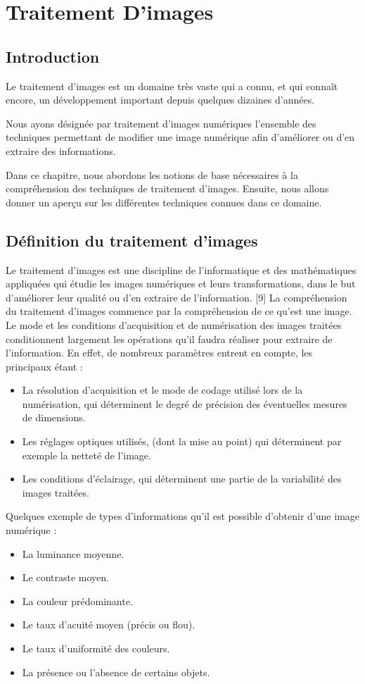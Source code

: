\documentclass[11pt]{report}
\begin{document}
\chapter{Traitement D'images}
\section{Introduction}
Le traitement d’images est un domaine très vaste qui a connu, et qui connaît encore,
un développement important depuis quelques dizaines d’années.

Nous ayons désignée par traitement d'images numériques l'ensemble des techniques
permettant de modifier une image numérique afin d'améliorer ou d'en extraire des
informations.

Dans ce chapitre, nous abordons les notions de base nécessaires à la compréhension
des techniques de traitement d’images. Ensuite, nous allons donner un aperçu sur les
différentes techniques connues dans ce domaine.


\section{Définition du traitement d’images}
Le traitement d'images est une discipline de l'informatique et des mathématiques
appliquées qui étudie les images numériques et leurs transformations, dans le but
d'améliorer leur qualité ou d'en extraire de l'information. [9]
La compréhension du traitement d'images commence par la compréhension de ce
qu'est une image. Le mode et les conditions d'acquisition et de numérisation des images
traitées conditionnent largement les opérations qu'il faudra réaliser pour extraire de
l'information. En effet, de nombreux paramètres entrent en compte, les principaux étant :

\begin{itemize}
\item La résolution d'acquisition et le mode de codage utilisé lors de la numérisation, qui
déterminent le degré de précision des éventuelles mesures de dimensions.
\item Les réglages optiques utilisés, (dont la mise au point) qui déterminent par exemple la
netteté de l'image.
\item Les conditions d'éclairage, qui déterminent une partie de la variabilité des images
traitées.
\end{itemize}
Quelques exemple de types d'informations qu'il est possible d'obtenir d'une image
numérique :
\begin{itemize}
\item La luminance moyenne.
\item  Le contraste moyen.
\item La couleur prédominante.
\item  Le taux d'acuité moyen (précis ou flou).
\item  Le taux d'uniformité des couleurs.
\item  La présence ou l'absence de certains objets.

\end{itemize}
\end{document}
